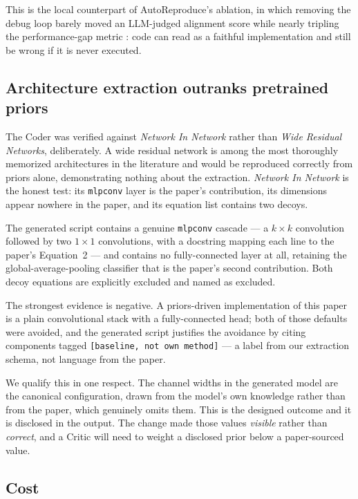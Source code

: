 \documentclass[11pt]{article}
\begin{document}
This is the local counterpart of AutoReproduce's ablation, in which removing the
debug loop barely moved an LLM-judged alignment score while nearly tripling the
performance-gap metric \cite{zhao2025autoreproduce}: code can read as a faithful
implementation and still be wrong if it is never executed.

\subsection{Architecture extraction outranks pretrained priors}

The Coder was verified against \emph{Network In Network} rather than \emph{Wide Residual
Networks}, deliberately. A wide residual network is among the most thoroughly memorized
architectures in the literature and would be reproduced correctly from priors alone,
demonstrating nothing about the extraction. \emph{Network In Network} is the honest test:
its \texttt{mlpconv} layer is the paper's contribution, its dimensions appear nowhere in
the paper, and its equation list contains two decoys.

The generated script contains a genuine \texttt{mlpconv} cascade --- a $k\times k$
convolution followed by two $1\times1$ convolutions, with a docstring mapping each line
to the paper's Equation~2 --- and contains no fully-connected layer at all, retaining the
global-average-pooling classifier that is the paper's second contribution. Both decoy
equations are explicitly excluded and named as excluded.

The strongest evidence is negative. A priors-driven implementation of this paper is a
plain convolutional stack with a fully-connected head; both of those defaults were
avoided, and the generated script justifies the avoidance by citing components tagged
\texttt{[baseline, not own method]} --- a label from our extraction schema, not language
from the paper.

We qualify this in one respect. The channel widths in the generated model are the
canonical configuration, drawn from the model's own knowledge rather than from the paper,
which genuinely omits them. This is the designed outcome and it is disclosed in the
output. The change made those values \emph{visible} rather than \emph{correct}, and a
Critic will need to weight a disclosed prior below a paper-sourced value.


\subsection{Cost}
\end{document}
